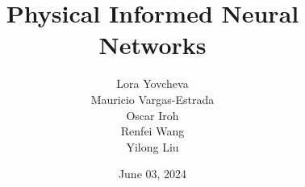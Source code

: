\documentclass{beamer}
\title{Physical Informed Neural Networks}
\date{June 03, 2024}
\author{Lora Yovcheva\\
Mauricio Vargas-Estrada\\
Oscar Iroh\\
Renfei Wang\\
Yilong Liu}
\begin{document}
\insertTitleSlide

%







\insertLastSlide
\end{document}
